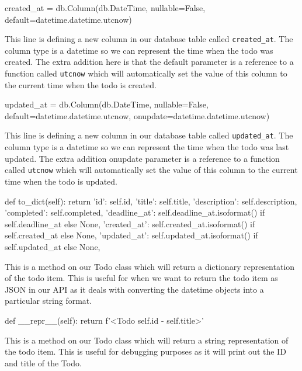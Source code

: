 \documentclass{csse4400}
\begin{document}
\begin{code}[language=python,numbers=none]{}
  created_at = db.Column(db.DateTime, nullable=False, default=datetime.datetime.utcnow)
\end{code}

This line is defining a new column in our database table called \texttt{created\_at}. The column type is a datetime so we can represent the time when the todo was created. The extra addition here is that the default parameter is a reference to a function called \texttt{utcnow} which will automatically set the value of this column to the current time when the todo is created.

\begin{code}[language=python,numbers=none]{}
  updated_at = db.Column(db.DateTime, nullable=False, default=datetime.datetime.utcnow, onupdate=datetime.datetime.utcnow)
\end{code}

This line is defining a new column in our database table called \texttt{updated\_at}. The column type is a datetime so we can represent the time when the todo was last updated. The extra addition onupdate parameter is a reference to a function called \texttt{utcnow} which will automatically set the value of this column to the current time when the todo is updated.

\begin{code}[language=python,numbers=none]{}
  def to_dict(self):
      return {
          'id': self.id,
          'title': self.title,
          'description': self.description,
          'completed': self.completed,
          'deadline_at': self.deadline_at.isoformat() if self.deadline_at else None,
          'created_at': self.created_at.isoformat() if self.created_at else None,
          'updated_at': self.updated_at.isoformat() if self.updated_at else None,
      }
\end{code}

This is a method on our Todo class which will return a dictionary representation of the todo item. This is useful for when we want to return the todo item as JSON in our API as it deals with converting the datetime objects into a particular string format.

\begin{code}[language=python,numbers=none]{}
  def __repr__(self):
      return f'<Todo {self.id} - {self.title}>'
\end{code}

This is a method on our Todo class which will return a string representation of the todo item. This is useful for debugging purposes as it will print out the ID and title of the Todo.
\end{document}

